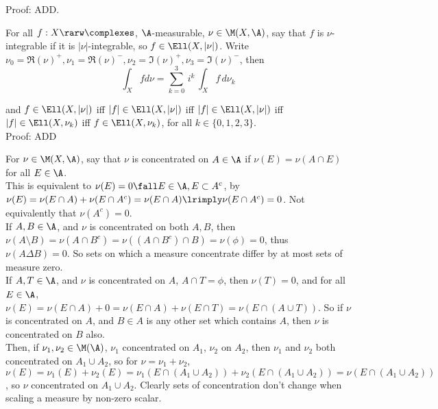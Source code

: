 \noindent
Proof: ADD.


For all $f:X \rarw \complexes$, $\A$-measurable, $\nu \in \M(X, \A)$, say that $f$ is $\nu$-integrable if it is $|\nu|$-integrable, so $f \in \Ell (X, |\nu|)$. Write $\nu_0 = \Re(\nu)^+, \nu_1 = \Re(\nu)^-, \nu_2 = \Im(\nu)^+, \nu_3 = \Im(\nu)^-$, then \\

$$
\int_X f d\nu = \sum_{k=0}^3 \, i^k \, \int_X f \, d\nu_k
$$

\noindent
and $f \in \Ell (X, |\nu|)$ iff $|f| \in \Ell (X, |\nu|)$ iff $|f| \in \Ell (X, |\nu|)$ iff $|f| \in \Ell (X, \nu_k)$ iff $f \in \Ell (X, \nu_k)$, for all $k \in \{0,1,2,3\}$. \\

\noindent
Proof: ADD \\





\break

For $\nu \in \M(X, \A)$, say that $\nu$ is concentrated on $A \in \A$ if $\nu(E) = \nu(A \cap E)$ for all $E \in \A$. \\

\noindent
This is equivalent to $\nu(E) = 0 \fall E \in \A, E \subset A^c$, by $\nu(E) = \nu(E \cap A) + \nu( E \cap A^c) = \nu(E \cap A) \lrimply \nu( E \cap A^c) = 0$.  Not equivalently that $\nu(A^c) = 0$. \\


\noindent
If $A,B \in \A$, and $\nu$ is concentrated on both $A,B$, then $\nu(A \setminus B) = \nu( A \cap B^c) = \nu( (A \cap B^c) \cap B ) = \nu( \phi ) = 0$, thus $\nu( A \Delta B) = 0$. So sets on which a measure concentrate differ by at most sets of measure zero. \\


\noindent
If $A,T \in \A$, and $\nu$ is concentrated on $A$, $A \cap T = \phi$, then $\nu(T) = 0$, and for all $E \in \A$, $\nu(E) = \nu(E \cap A) + 0 = \nu(E \cap A) + \nu(E \cap T) = \nu(E \cap (A \cup T))$. So if $\nu$ is concentrated on $A$, and $B \in A$ is any other set which contains $A$, then $\nu$ is concentrated on $B$ also. \\


\noindent
Then, if $\nu_1, \nu_2 \in \M(\A)$, $\nu_1$ concentrated on $A_1$, $\nu_2$ on $A_2$, then $\nu_1$ and $\nu_2$ both concentrated on $A_1 \cup A_2$, so for $\nu = \nu_1 + \nu_2$, $\nu(E) = \nu_1(E) + \nu_2(E) = \nu_1(E \cap (A_1 \cup A_2) ) + \nu_2(E \cap (A_1 \cup A_2) ) = \nu(E \cap (A_1 \cup A_2))$, so $\nu$ concentrated on $A_1\cup A_2$. Clearly sets of concentration don't change when scaling a measure by non-zero scalar. \\



